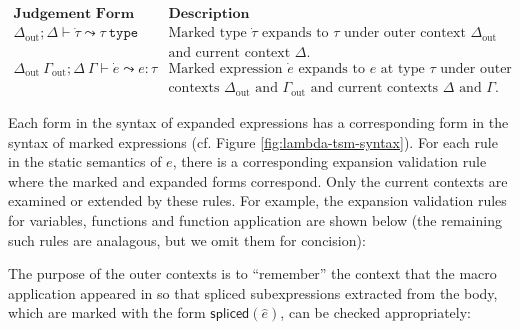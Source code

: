\begin{enumerate}
$\begin{array}{ll}
\textbf{Judgement Form} & \textbf{Description}\\
\Delta_\text{out}; \Delta \vdash \dot{\tau} \leadsto \tau~\mathtt{type} & \text{Marked type $\dot{\tau}$ expands to $\tau$ under outer context $\Delta_\text{out}$}\\
& \text{and current context $\Delta$.}\\
\Delta_\text{out}~\Gamma_\text{out}; \Delta~\Gamma \vdash \dot{e} \leadsto e : \tau & \text{Marked expression $\dot{e}$ expands to $e$ at type $\tau$ under outer}\\
& \text{contexts $\Delta_\text{out}$ and $\Gamma_\text{out}$ and current contexts $\Delta$ and $\Gamma$.}
\end{array}$

Each form in the syntax of expanded expressions has a corresponding form in the syntax of marked expressions (cf. Figure \ref{fig:lambda-tsm-syntax}). For each rule in the static semantics of $e$, there is a corresponding expansion validation rule where the marked and expanded forms correspond. Only the current contexts are examined or extended by these rules. For example, the expansion validation rules for variables, functions and function application are shown below (the remaining such rules are analagous, but we omit them for concision):
\begin{mathpar}


\end{mathpar}

The purpose of the outer contexts is to ``remember'' the context that the macro application appeared in so that spliced subexpressions extracted from the body, which are marked with the form $\mathsf{spliced}(\hat{e})$, can be checked appropriately:
\begin{mathpar}
\end{mathpar}


\end{enumerate}

